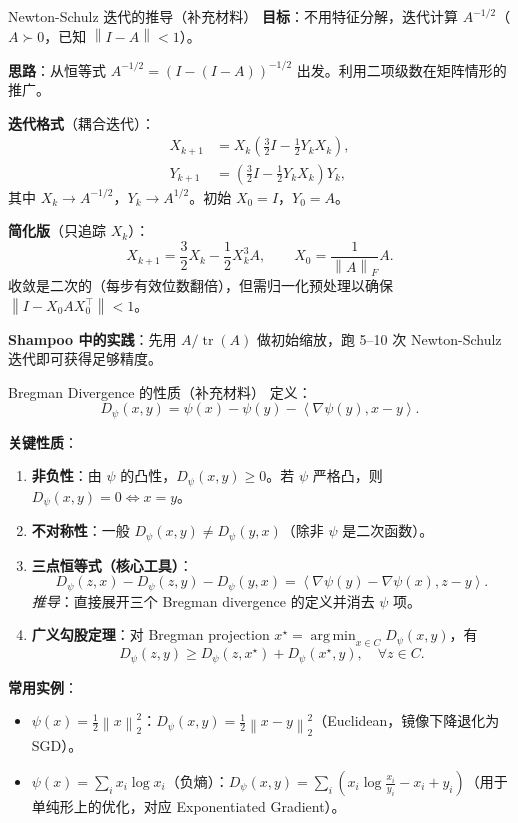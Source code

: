 \documentclass[aspectratio=169,10pt]{ctexbeamer}
\newcommand{\tr}{\operatorname{tr}}
\newcommand{\grad}{\nabla}
\newcommand{\norm}[1]{\left\lVert #1 \right\rVert}
\newcommand{\ip}[2]{\left\langle #1,#2 \right\rangle}
\DeclareMathOperator*{\argmin}{arg\,min}
\begin{document}
\begin{frame}{Newton-Schulz 迭代的推导（补充材料）}
\textbf{目标}：不用特征分解，迭代计算 $A^{-1/2}$（$A\succ0$，已知 $\norm{I-A}<1$）。

\vspace{.2cm}
\textbf{思路}：从恒等式 $A^{-1/2}=(I-(I-A))^{-1/2}$ 出发。利用二项级数在矩阵情形的推广。

\vspace{.15cm}
\textbf{迭代格式}（耦合迭代）：
\[
  \begin{aligned}
  X_{k+1} &= X_k\left(\frac{3}{2}I-\frac{1}{2}Y_k X_k\right),\\
  Y_{k+1} &= \left(\frac{3}{2}I-\frac{1}{2}Y_k X_k\right)Y_k,
  \end{aligned}
\]
其中 $X_k\to A^{-1/2}$，$Y_k\to A^{1/2}$。初始 $X_0=I$，$Y_0=A$。

\vspace{.15cm}
\textbf{简化版}（只追踪 $X_k$）：
\[
  X_{k+1}=\frac{3}{2}X_k-\frac{1}{2}X_k^3 A,\qquad X_0=\frac{1}{\norm{A}_F}A.
\]
收敛是二次的（每步有效位数翻倍），但需归一化预处理以确保 $\norm{I-X_0 A X_0^\top}<1$。

\vspace{.2cm}
\textbf{Shampoo 中的实践}：先用 $A/\tr(A)$ 做初始缩放，跑 5--10 次 Newton-Schulz 迭代即可获得足够精度。
\end{frame}

\begin{frame}{Bregman Divergence 的性质（补充材料）}
定义：
\[
  D_\psi(x,y)=\psi(x)-\psi(y)-\ip{\grad\psi(y)}{x-y}.
\]

\vspace{.15cm}
\textbf{关键性质}：
\begin{enumerate}
  \item \textbf{非负性}：由 $\psi$ 的凸性，$D_\psi(x,y)\ge0$。若 $\psi$ 严格凸，则 $D_\psi(x,y)=0\iff x=y$。
  \item \textbf{不对称性}：一般 $D_\psi(x,y)\neq D_\psi(y,x)$（除非 $\psi$ 是二次函数）。
  \item \textbf{三点恒等式（核心工具）}：
  \[
    D_\psi(z,x)-D_\psi(z,y)-D_\psi(y,x)=\ip{\grad\psi(y)-\grad\psi(x)}{z-y}.
  \]
  \textit{推导}：直接展开三个 Bregman divergence 的定义并消去 $\psi$ 项。
  \item \textbf{广义勾股定理}：对 Bregman projection $x^\star=\argmin_{x\in C}D_\psi(x,y)$，有
  \[
    D_\psi(z,y)\ge D_\psi(z,x^\star)+D_\psi(x^\star,y),\quad\forall z\in C.
  \]
\end{enumerate}

\vspace{.15cm}
\textbf{常用实例}：
\begin{itemize}
  \item $\psi(x)=\frac12\norm{x}_2^2$：$D_\psi(x,y)=\frac12\norm{x-y}_2^2$（Euclidean，镜像下降退化为 SGD）。
  \item $\psi(x)=\sum_i x_i\log x_i$（负熵）：$D_\psi(x,y)=\sum_i(x_i\log\frac{x_i}{y_i}-x_i+y_i)$（用于单纯形上的优化，对应 Exponentiated Gradient）。
\end{itemize}
\end{frame}
\end{document}
